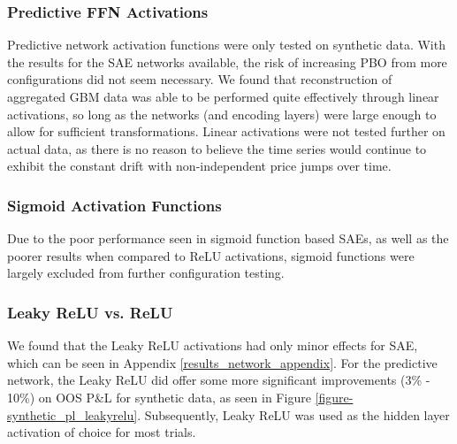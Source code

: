 \documentclass[a4paper,11pt,oneside]{article}
\theoremstyle{plain}
\theoremstyle{definition}
\begin{document}
	\subsubsection{Predictive FFN Activations}
	
	Predictive network activation functions were only tested on synthetic data. With the results for the SAE networks available, the risk of increasing PBO from more configurations did not seem necessary. We found that reconstruction of aggregated GBM data was able to be performed quite effectively through linear activations, so long as the networks (and encoding layers) were large enough to allow for sufficient transformations. Linear activations were not tested further on actual data, as there is no reason to believe the time series would continue to exhibit the constant drift with non-independent price jumps over time. 
	
	\subsubsection{Sigmoid Activation Functions} 
	
	Due to the poor performance seen in sigmoid function based SAEs, as well as the poorer results when compared to ReLU activations, sigmoid functions were largely excluded from further configuration testing.
	
	\subsubsection{Leaky ReLU vs. ReLU}
	
	We found that the Leaky ReLU activations had only minor effects for SAE, which can be seen in Appendix \ref{results_network_appendix}. For the predictive network, the Leaky ReLU did offer some more significant improvements (3\% - 10\%) on OOS P\&L for synthetic data, as seen in Figure \ref{figure-synthetic_pl_leakyrelu}. Subsequently, Leaky ReLU was used as the hidden layer activation of choice for most trials.
	
\end{document}

